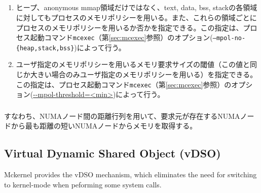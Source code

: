 \documentclass[twoside,11pt,fleqn]{book}
\newcommand\textttw[1]{\mathchardef\UrlBreakPenalty=100\mathchardef\UrlBigBreakPenalty=100\url{#1}}
\begin{document}

\subsection{}
\subsubsection{}
\begin{enumerate}
\item ヒープ、anonymous mmap領域だけではなく、text, data, bss, stackの各領域に対してもプロセスのメモリポリシーを用いる。また、これらの領域ごとにプロセスのメモリポリシーを用いるか否かを指定できる。この指定は、プロセス起動コマンド\texttt{mcexec}（第\ref{sec:mcexec}参照）のオプション(\texttt{--mpol-no-\{heap,stack,bss\}})によって行う。
\item ユーザ指定のメモリポリシーを用いるメモリ要求サイズの閾値（この値と同じか大きい場合のみユーザ指定のメモリポリシーを用いる）を指定できる。この指定は、プロセス起動コマンド\texttt{mcexec}（第\ref{sec:mcexec}参照）のオプション(\textttw{--mpol-threshold=<min>})によって行う。
\end{enumerate}

\subsubsection{}
すなわち、NUMAノード間の距離行列を用いて、要求元が存在するNUMAノードから最も距離の短いNUMAノードからメモリを取得する。

\subsection{Virtual Dynamic Shared Object (vDSO)}
\label{sec:vdso}
Mckernel provides the vDSO mechanism, which eliminates the need for switching to kernel-mode when peforming some system calls.
\end{document}

